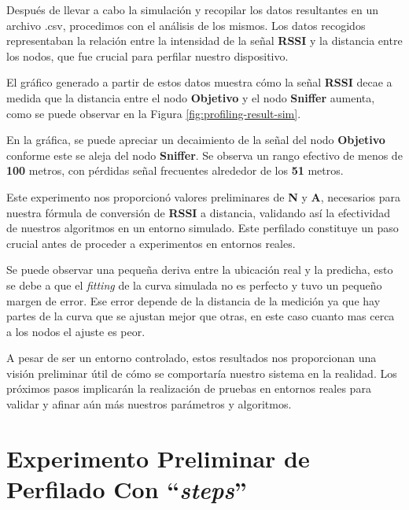 Después de llevar a cabo la simulación y recopilar los datos resultantes en un archivo .csv, procedimos con el análisis de los mismos. Los datos recogidos representaban la relación entre la intensidad de la señal \textbf{RSSI} y la distancia entre los nodos, que fue crucial para perfilar nuestro dispositivo.

El gráfico generado a partir de estos datos muestra cómo la señal \textbf{RSSI} decae a medida que la distancia entre el nodo \textbf{Objetivo} y el nodo \textbf{Sniffer} aumenta, como se puede observar en la Figura \ref{fig:profiling-result-sim}.

En la gráfica, se puede apreciar un decaimiento de la señal del nodo \textbf{Objetivo} conforme este se aleja del nodo \textbf{Sniffer}. Se observa un rango efectivo de menos de \textbf{100} metros, con pérdidas señal frecuentes alrededor de los \textbf{51} metros.

Este experimento nos proporcionó valores preliminares de \textbf{N} y \textbf{A}, necesarios para nuestra fórmula de conversión de \textbf{RSSI} a distancia, validando así la efectividad de nuestros algoritmos en un entorno simulado. Este perfilado constituye un paso crucial antes de proceder a experimentos en entornos reales.

Se puede observar una pequeña deriva entre la ubicación real y la predicha, esto se debe a que el \textit{fitting} de la curva simulada no es perfecto y tuvo un pequeño margen de error. Ese error depende de la distancia de la medición ya que hay partes de la curva que se ajustan mejor que otras, en este caso cuanto mas cerca a los nodos el ajuste es peor.

A pesar de ser un entorno controlado, estos resultados nos proporcionan una visión preliminar útil de cómo se comportaría nuestro sistema en la realidad. Los próximos pasos implicarán la realización de pruebas en entornos reales para validar y afinar aún más nuestros parámetros y algoritmos.

\section{Experimento Preliminar de Perfilado Con \textbf{“\textit{steps}”} }




